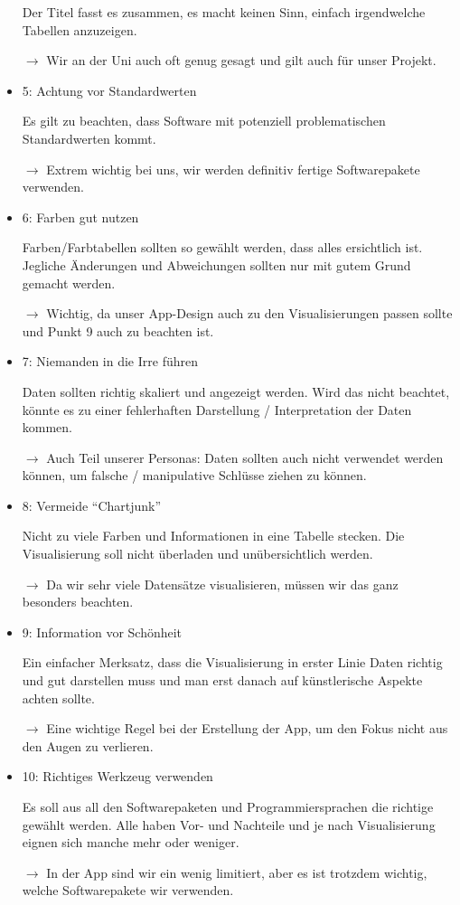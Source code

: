 \begin{paracol}{2}
\begin{itemize}
    Der Titel fasst es zusammen, es macht keinen Sinn, einfach irgendwelche Tabellen anzuzeigen. 

    $\rightarrow$ Wir an der Uni auch oft genug gesagt und gilt auch für unser Projekt.
    \item 5: Achtung vor Standardwerten
    
    Es gilt zu beachten, dass Software mit potenziell problematischen Standardwerten kommt. 

    $\rightarrow$ Extrem wichtig bei uns, wir werden definitiv fertige Softwarepakete verwenden.
\switchcolumn
    \item 6: Farben gut nutzen
    
    Farben/Farbtabellen sollten so gewählt werden, dass alles ersichtlich ist. Jegliche Änderungen und Abweichungen sollten nur mit gutem Grund gemacht werden.

    $\rightarrow$ Wichtig, da unser App-Design auch zu den Visualisierungen passen sollte und Punkt 9 auch zu beachten ist.
    \item 7: Niemanden in die Irre führen
    
    Daten sollten richtig skaliert und angezeigt werden. Wird das nicht beachtet, könnte es zu einer fehlerhaften Darstellung / Interpretation der Daten kommen.

    $\rightarrow$ Auch Teil unserer Personas: Daten sollten auch nicht verwendet werden können, um falsche / manipulative Schlüsse ziehen zu können.

    \item 8: Vermeide “Chartjunk”
    
    Nicht zu viele Farben und Informationen in eine Tabelle stecken. Die Visualisierung soll nicht überladen und unübersichtlich werden.

    $\rightarrow$ Da wir sehr viele Datensätze visualisieren, müssen wir das ganz besonders beachten.

    \item 9: Information vor Schönheit
    
    Ein einfacher Merksatz, dass die Visualisierung in erster Linie Daten richtig und gut darstellen muss und man erst danach auf künstlerische Aspekte achten sollte.

    $\rightarrow$ Eine wichtige Regel bei der Erstellung der App, um den Fokus nicht aus den Augen zu verlieren.

    \item 10: Richtiges Werkzeug verwenden
    
    Es soll aus all den Softwarepaketen und Programmiersprachen die richtige gewählt werden. Alle haben Vor- und Nachteile und je nach Visualisierung eignen sich manche mehr oder weniger.

    $\rightarrow$ In der App sind wir ein wenig limitiert, aber es ist trotzdem wichtig, welche Softwarepakete wir verwenden.
\end{itemize}
%
\end{paracol}